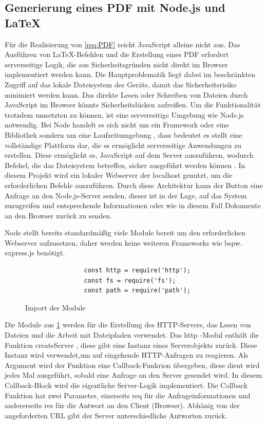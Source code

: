 \documentclass[11pt,a4paper]{report}
\begin{document}
\subsection{Generierung eines PDF mit Node.js und LaTeX}
Für die Realisierung von \ref{req:PDF} reicht JavaScript alleine nicht aus. Das Ausführen von LaTeX-Befehlen und die Erstellung eines PDF erfordert serverseitige Logik, die aus Sicherheitsgründen nicht direkt im Browser implementiert werden kann. Die Hauptproblematik liegt dabei im beschränkten Zugriff auf das lokale Dateisystem des Geräts, damit das Sicherheitsrisiko minimiert werden kann. Das direkte Lesen oder Schreiben von Dateien durch JavaScript im Browser könnte Sicherheitslücken aufreißen. Um die Funktionalität trotzdem umsetzten zu können, ist eine serverseitige Umgebung wie Node.js notwendig. Bei Node handelt es sich nicht um ein Framework oder eine Bibliothek sondern um eine Laufzeitumgebung \cite{Syed}, dass bedeutet es stellt eine vollständige Plattform dar, die es ermöglicht serverseitige Anwendungen zu erstellen. Diese ermöglicht es, JavaScript auf dem Server auszuführen, wodurch Befehel, die das Dateisystem betreffen, sicher ausgeführt werden können \cite{Syed}. In diesem Projekt wird ein lokaler Webserver der \glqq localhost \grqq{} genutzt, um die erforderlichen Befehle auszuführen. Durch diese Architektur kann der Button eine Anfrage an den Node.js-Server senden, dieser ist in der Lage, auf das System zuzugreifen und entsprechende Informationen oder wie in diesem Fall Dokumente an den Browser zurück zu senden.

\noindent
Node stellt bereits standardmäßig viele Module bereit um den erforderlichen Webserver aufzusetzen, daher werden keine weiteren Frameworks wie bspw. \glqq express.js \grqq{} benötigt.

\begin{figure}[H]
    \begin{verbatim}
                const http = require('http');
                const fs = require('fs');
                const path = require('path');  
    \end{verbatim}
    \centering
    \caption{Import der Module}
    \label{code:Import_Module}
\end{figure}

\noindent
Die Module aus \ref{code:Import_Module} werden für die Erstellung des HTTP-Servers, das Lesen von Dateien und die Arbeit mit Dateipfaden verwendet. Das \glqq http \grqq{}-Modul enthält die Funktion \glqq createServer \grqq{}, diese gibt eine Instanz eines Serverobjekts zurück. Diese Instanz wird verwendet,um auf eingehende HTTP-Anfragen zu reagieren. Als Argument wird der Funktion eine Callback-Funkrion übergeben, diese dient wird jedes Mal ausgeführt, sobald eine Anfrage an den Server gesendet wird. In diesem Callback-Block wird die eigentliche Server-Logik implementiert. Die Callback Funktion hat zwei Parameter, einerseits \glqq req \grqq{} für die Anfrageinformationen und andererseits \glqq res \grqq{} für die Antwort an den Client (Browser). Abhänig von der angeforderten URL gibt der Server unterschiedliche Antworten zurück. \newpage
\end{document}
